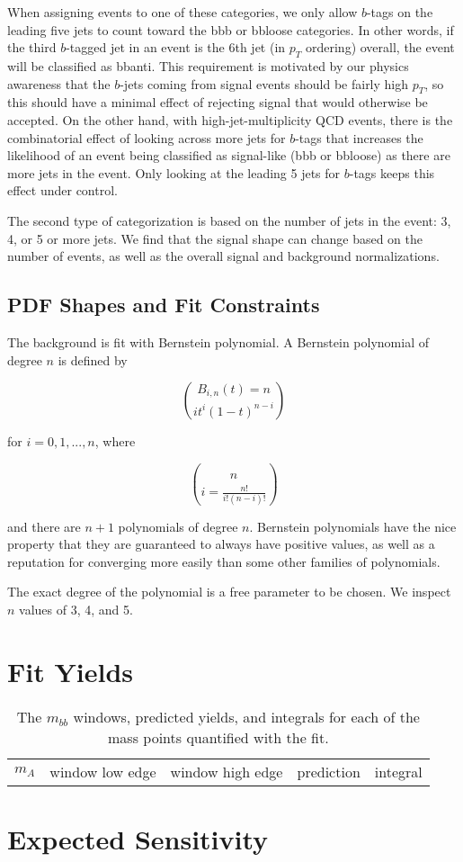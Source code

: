 When assigning events to one of these categories, we only allow $b$-tags on the leading
five jets to count toward the bbb or bbloose categories.  In other words, if the third
$b$-tagged jet in an event is the 6th jet (in $p_T$ ordering) overall, the event 
will be classified as bbanti.  This requirement is motivated by our physics awareness that
the $b$-jets coming from signal events should be fairly high $p_T$, so this should have
a minimal effect of rejecting signal that would otherwise be accepted.  On the other
hand, with high-jet-multiplicity QCD events, there is the combinatorial effect of looking across
more jets for $b$-tags that increases the likelihood of an event being classified as signal-like
(bbb or bbloose) as there are more jets in the event.  Only looking at the leading 5 jets
for $b$-tags keeps this effect under control. 


The second type of categorization is based on the number of 
jets in the event: 3, 4, or 5 or more jets.  We find that the signal
shape can change based on the number of events, as well as the overall
signal and background normalizations. 




\subsection{PDF Shapes and Fit Constraints}
\label{sec:pdfs}

The background is fit with Bernstein polynomial.  A Bernstein polynomial of degree $n$ is
defined by

\begin{equation}
B_{i,n}(t) = n\choose{i} t^i (1-t)^{n-i}
\end{equation}

for $i=0,1,...,n$, where

\begin{equation}
n\choose{i} = \frac{n!}{i!(n-i)!}
\end{equation}

and there are $n+1$ polynomials of degree $n$.  Bernstein polynomials have the nice property
that they are guaranteed to always have positive values, as well as a reputation for
converging more easily than some other families of polynomials.

The exact degree of the polynomial is a free parameter to be chosen.  We inspect $n$ values
of 3, 4, and 5.





\section{Fit Yields}
\begin{table}
\caption{The $m_{bb}$ windows, predicted yields, and integrals for each of the
    mass points quantified with the fit. \label{tab:bkg_fit_yields}}
    \begin{tabular}{ c c c c c }
        $m_A$ & window low edge & window high edge & prediction & integral \\
    \end{tabular}
\end{table}


\section{Expected Sensitivity}


